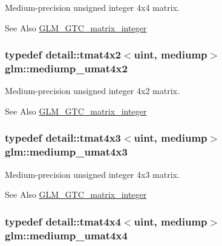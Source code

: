 Medium-\/precision unsigned integer 4x4 matrix. \begin{DoxySeeAlso}{See Also}
\hyperlink{group__gtc__matrix__integer}{G\-L\-M\-\_\-\-G\-T\-C\-\_\-matrix\-\_\-integer} 
\end{DoxySeeAlso}
\hypertarget{group__gtc__matrix__integer_ga8ea45737e8bc9bfae2668968056b109f}{
\subsubsection[{mediump\-\_\-umat4x2}]{\setlength{\rightskip}{0pt plus 5cm}typedef detail\-::tmat4x2$<$uint, mediump$>$ {\bf glm\-::mediump\-\_\-umat4x2}}}\label{group__gtc__matrix__integer_ga8ea45737e8bc9bfae2668968056b109f}
Medium-\/precision unsigned integer 4x2 matrix. \begin{DoxySeeAlso}{See Also}
\hyperlink{group__gtc__matrix__integer}{G\-L\-M\-\_\-\-G\-T\-C\-\_\-matrix\-\_\-integer} 
\end{DoxySeeAlso}
\hypertarget{group__gtc__matrix__integer_gaebe3b1b4b6030c096447e40fb00528f4}{
\subsubsection[{mediump\-\_\-umat4x3}]{\setlength{\rightskip}{0pt plus 5cm}typedef detail\-::tmat4x3$<$uint, mediump$>$ {\bf glm\-::mediump\-\_\-umat4x3}}}\label{group__gtc__matrix__integer_gaebe3b1b4b6030c096447e40fb00528f4}
Medium-\/precision unsigned integer 4x3 matrix. \begin{DoxySeeAlso}{See Also}
\hyperlink{group__gtc__matrix__integer}{G\-L\-M\-\_\-\-G\-T\-C\-\_\-matrix\-\_\-integer} 
\end{DoxySeeAlso}
\hypertarget{group__gtc__matrix__integer_ga24b1c76fefa58f810e24cafe0ea6a6a0}{
\subsubsection[{mediump\-\_\-umat4x4}]{\setlength{\rightskip}{0pt plus 5cm}typedef detail\-::tmat4x4$<$uint, mediump$>$ {\bf glm\-::mediump\-\_\-umat4x4}}}\label{group__gtc__matrix__integer_ga24b1c76fefa58f810e24cafe0ea6a6a0}
